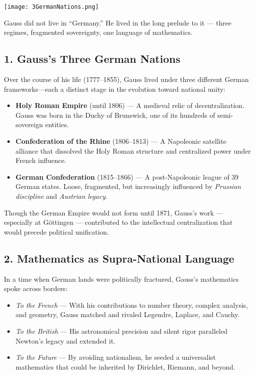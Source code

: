 \documentclass[9pt]{article}
\begin{document}
\begin{center}
    \texttt{[image: 3GermanNations.png]}
\end{center}

\vspace{1em}

\noindent
Gauss did not live in “Germany.”  
He lived in the long prelude to it — three regimes, fragmented sovereignty, one language of mathematics.

\subsection*{1. Gauss’s Three German Nations}

Over the course of his life (1777–1855), Gauss lived under three different German frameworks—each a distinct stage in the evolution toward national unity:

\begin{itemize}
  \item \textbf{Holy Roman Empire} (until 1806) — A medieval relic of decentralization. Gauss was born in the Duchy of Brunswick, one of its hundreds of semi-sovereign entities.
  
  \item \textbf{Confederation of the Rhine} (1806–1813) — A Napoleonic satellite alliance that dissolved the Holy Roman structure and centralized power under French influence.

  \item \textbf{German Confederation} (1815–1866) — A post-Napoleonic league of 39 German states. Loose, fragmented, but increasingly influenced by \textit{Prussian discipline} and \textit{Austrian legacy}.
\end{itemize}

Though the German Empire would not form until 1871, Gauss’s work — especially at Göttingen — contributed to the intellectual centralization that would precede political unification.

\subsection*{2. Mathematics as Supra-National Language}

In a time when German lands were politically fractured, Gauss’s mathematics spoke across borders:

\begin{itemize}
  \item \textit{To the French} — With his contributions to number theory, complex analysis, and geometry, Gauss matched and rivaled Legendre, Laplace, and Cauchy.
  \item \textit{To the British} — His astronomical precision and silent rigor paralleled Newton’s legacy and extended it.
  \item \textit{To the Future} — By avoiding nationalism, he seeded a universalist mathematics that could be inherited by Dirichlet, Riemann, and beyond.
\end{itemize}
\end{document}
